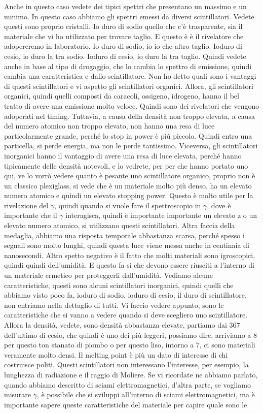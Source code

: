 {Anche in questo caso vedete dei tipici spettri che presentano un massimo e un minimo. In questo caso abbiamo gli spettri emessi da diversi scintillatori. Vedete questi sono proprio cristalli. Io duro di sodio quello che c'è trasparente, sia il materiale che vi ho utilizzato per trovare taglio. E questo è è il rivelatore che adopereremo in laboratorio. Io duro di sodio, io io che altro taglio. Ioduro di cesio, io duro la tra sodio. Ioduro di cesio, io duro la tra taglio. Quindi vedete anche in base al tipo di drogaggio, che lo cambia lo spettro di emissione, quindi cambia una caratteristica e dallo scintillatore. Non ho detto quali sono i vantaggi di questi scintillatori e vi aspetto gli scintillatori organici. Allora, gli scintillatori organici, quindi quelli composti da caracoli, ossigeno, idrogeno, hanno il bel tratto di avere una emissione molto veloce. Quindi sono dei rivelatori che vengono adoperati nel timing. Tuttavia, a causa della densità non troppo elevata, a causa del numero atomico non troppo elevato, non hanno una resa di luce particolarmente grande, perché lo stop in power è più piccolo. Quindi entro una particella, si perde energia, ma non le perde tantissimo. Viceversa, gli scintillatori inorganici hanno il vantaggio di avere una resa di luce elevata, perché hanno tipicamente delle densità notevoli, e lo vedrete, per per che hanno portato uno qui, ve lo vorrò vedere quanto è pesante uno scintillatore organico, proprio non è un classico plexiglass, si vede che è un materiale molto più denso, ha un elevato numero atomico e quindi un elevato stopping power. Questo è molto utile per la rivelazione del $\gamma$, quindi quando si vuole fare il spettroscopio in $\gamma$, dove è importante che il $\gamma$ interagisca, quindi è importante importante un elevato z o un elevato numero atomico, si utilizzano questi scintillatori. Altra faccia della medaglia, abbiamo una risposta temporale abbastanza scarsa, perché spesso i segnali sono molto lunghi, quindi questa luce viene messa anche in centinaia di nanosecondi. Altro spetto negativo è il fatto che molti materiali sono igroscopici, quindi quindi dell'umidità. E questo fa sì che devono essere riusciti a l'interno di un materiale ermetico per proteggerli dall'umidità. Vediamo alcune caratteristiche, questi sono alcuni scintillatori inorganici, quindi quelli che abbiamo visto poco fa, ioduro di sodio, ioduro di cesio, il duro di scintillatore, non entriamo nella dettaglio di tutti. Vi faccio vedere appunto, sono le caratteristiche che si vanno a vedere quando si deve scegliero uno scintillatore. Allora la densità, vedete, sono densità abbastanza elevate, partiamo dai 367 dell'ultimo di cesio, che quindi è uno dei più leggeri, possiamo dire, arriviamo a 8 per questo ton stanato di piombo o per questo liso, intorno a 7, ci sono materiali veramente molto densi. Il melting point è più un dato di interesse di chi costruisce politi. Questi scintillatori non interessano l'interesse, per esempio, la lunghezza di radiazione e il raggio di Moliere. Se vi ricordate ne abbiamo parlato, quando abbiamo descritto di sciami elettromagnetici, d'altra parte, se vogliamo misurare $\gamma$, è possibile che si sviluppi all'interno di sciami elettromagnetici, ma è importante sapere queste caratteristiche del materiale per capire quale sono le }

